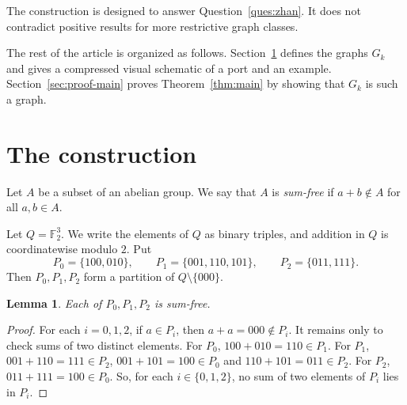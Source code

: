 \documentclass[12pt]{article}
\newtheorem{lemma}{Lemma}
\newcommand{\F}{\mathbb F}
\begin{document}
The construction  is designed to answer Question~\ref{ques:zhan}. It does not contradict positive results for more restrictive graph classes.

The rest of the article is organized as follows. 
Section~\ref{sec:construction} defines the graphs $G_k$ and gives a compressed visual schematic of a port and an example. 
Section~\ref{sec:proof-main} proves Theorem~\ref{thm:main} by showing that $G_k$ is such a graph. %


\section{The construction}\label{sec:construction}



Let $A$ be a subset of an abelian group. We say that $A$ is \emph{sum-free} if $a+b\notin A$ for all $a,b\in A$.





Let $Q=\F_2^3$.
We write the elements of $Q$ as binary triples, and addition in $Q$ is coordinatewise modulo $2$. Put
\[
P_0=\{100,010\},\qquad
P_1=\{001,110,101\},\qquad
P_2=\{011,111\}.
\]
Then $P_0,P_1,P_2$ form a partition of $Q\setminus\{000\}$.

\begin{lemma}\label{lem:sumfree}
Each of $P_0,P_1,P_2$  is sum-free.
\end{lemma}

\begin{proof}  For each $i=0,1,2$, if $a\in P_i$, then 
$a+a=000\notin P_i$. It remains only to check sums of two distinct elements. For $P_0$, $100+010=110\in P_1$.
For $P_1$, $001+110=111\in P_2$, 
$001+101=100\in P_0$ and 
$110+101=011\in P_2$.
For $P_2$, $011+111=100\in P_0$.
So, for each $i\in\{0,1,2\}$, no sum of two elements of $P_i$ lies in $P_i$.
\end{proof}
\end{document}
